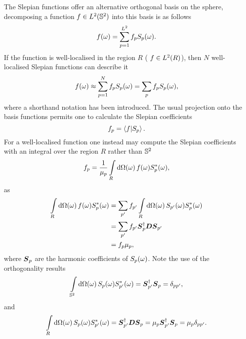The Slepian functions offer an alternative orthogonal basis on the sphere, decomposing a function \(f \in \hilbert{\twoSphere}\) into this basis is as follows
%
\begin{equation}
	\pixel{f}
	= \sum\limits_{p=1}^{L^{2}} \slepian{f}\pixel{\slepian{S}}.
\end{equation}
%
If the function is well-localised in the region \(R\) (\ie{} \(f \in \hilbert{R}\)), then \(N\) well-localised Slepian functions can describe it
%
\begin{equation}\label{eq:chapter3_slepian_inverse}
	\pixel{f}
	\approx \sum\limits_{p=1}^{N} \slepian{f}\pixel{\slepian{S}} \\
	= \slepianSum \slepian{f}\pixel{\slepian{S}},
\end{equation}
%
where a shorthand notation has been introduced.
The usual projection onto the basis functions permits one to calculate the Slepian coefficients
%
\begin{equation}
	\slepian{f}
	= \braket{f}{\slepian{S}}.
\end{equation}
%
For a well-localised function one instead may compute the Slepian coefficients with an integral over the region \(R\) rather than \(\twoSphere{}\)
%
\begin{equation}
	\slepian{f}
	= \frac{1}{\slepian{\mu}} \integrateRegion{\omega} \pixel{f} \pixel{\conj{\slepian{S}}},
\end{equation}
%
as
%
\begin{align}
	\integrateRegion{\omega} \pixel{f} \pixel{\conj{\slepian{S}}}
	 & = \slepianSum['] \slepian[']{f} \integrateRegion{\omega} \pixel{\slepian[']{S}} \pixel{\conj{\slepian{S}}} \nonumber \\
	 & = \slepianSum['] \slepian[']{f} \slepian{\vb*{S}}^{\dagger} \vb*{D} \slepian[']{\vb*{S}} \nonumber                   \\
	 & = \slepian{f} \slepian{\mu},
\end{align}
%
where \(\slepian{\vb*{S}}\) are the harmonic coefficients of \(\pixel{\slepian{S}}\).
Note the use of the orthogonality results
%
\begin{equation}\label{eq:chapter3_orthogonality_sphere}
	\integrateSphere{\omega} \pixel{\slepian{S}} \pixel{\conj{\slepian[']{S}}}
	= \slepian[']{\vb*{S}}^{\dagger} \slepian{\vb*{S}}
	= \delta_{pp'},
\end{equation}
%
and
%
\begin{equation}
	\integrateRegion{\omega} \pixel{\slepian{S}} \pixel{\conj{\slepian[']{S}}}
	= \slepian[']{\vb*{S}}^{\dagger} \vb*{D} \slepian{\vb*{S}}
	= \slepian{\mu} \slepian[']{\vb*{S}}^{\dagger} \slepian{\vb*{S}}
	= \slepian{\mu} \delta_{pp'}.
\end{equation}

